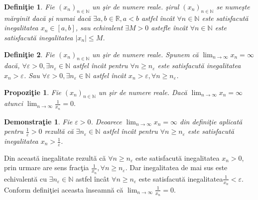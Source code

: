 \documentclass[a4paper,12pt,oneside]{report}
\newtheorem{definition}{Defini\c tie}
\newtheorem{proposition}{Propozi\c tie}
\newtheorem{demonstration}{Demonstra\c tie}
\begin{document}
\begin{definition}
  Fie \((x_{n})_{n\in \mathbb{N}}\) un \c sir de numere reale. \c sirul \((x_{n})_{n\in \mathbb{N}}\) se nume\c ste m\u arginit dac\u a \c si numai dac\u a \(\exists  a, b \in \mathbb{R}, a< b\) astfel \^ inc\^ at \(\forall n\in \mathbb{N}\) este satisfacut\u a inegalitatea \(x_{n}\in \left [ a,b \right ]\), sau echivalent \(\exists M> 0\) astefle \^ inc\^ at \(\forall  n\in \mathbb{N}\) este satisfacut\u a inegalitatea \(\left | x_{n} \right |\leq M\).
\end{definition}

\begin{definition}
  Fie \((x_{n})_{n\in \mathbb{N}}\) un \c sir de numere reale. Spunem c\u a \(\lim_{n \to \infty }x_{n}=\infty\) dac\u a, \(\forall \varepsilon > 0,\exists n_{\varepsilon }\in \mathbb{N}\) astfel \^ inc\^ at pentru \(\forall n\geq n_{\varepsilon }\) este satisfacut\u a inegalitatea \(x_{n}> \varepsilon\). 
Sau \(\forall \varepsilon > 0,\exists n_{\varepsilon }\in \mathbb{N}\) astfel \^ inc\^ at \(x_{n}> \varepsilon ,\forall n\geq n_{\varepsilon }\). 
\end{definition}


\begin{proposition}
  Fie \((x_{n})_{n\in \mathbb{N}}\) un \c sir de numere reale. Dac\u a \(\lim_{n \to \infty }x_{n}=\infty\) atunci \( \lim_{n \to \infty }\frac{1}{x_{n}}=0.\) 
\end{proposition}

\begin{demonstration}
  Fie \(\varepsilon > 0\). Deoarece \(\lim_{n \to \infty }x_{n}=\infty\) din defini\c tie aplicat\u a pentru \(\frac{1}{\varepsilon }> 0\) rezult\u a c\u a \(\exists n_{\varepsilon }\in \mathbb{N}\) astfel \^ inc\^ at pentru \(\forall n\geq n_{\varepsilon }\) este satisfacut\u a inegalitatea \(x_{n}> \frac{1}{\varepsilon }\).
\end{demonstration}
 

Din aceast\u a inegalitate rezult\u a c\u a \(\forall n\geq n_{\varepsilon }\) este satisfacut\u a inegalitatea \(x_{n}> 0\), prin urmare are sens frac\c tia \(\frac{1}{x_{n}}, \forall n\geq n_{\varepsilon }\). Dar inegalitatea de mai sus este echivalent\u a cu \(\exists n_{\varepsilon }\in \mathbb{N}\) astfel \^ inc\^ at \(\forall n\geq n_{\varepsilon }\) este satisfacut\u a inegalitatea\( \frac{1}{x_{n}}< \varepsilon.\) Conform defini\c tiei aceasta \^ inseamn\u a c\u a \(\lim_{n \to \infty }\frac{1}{x_{n}}=0\).
\end{document}
